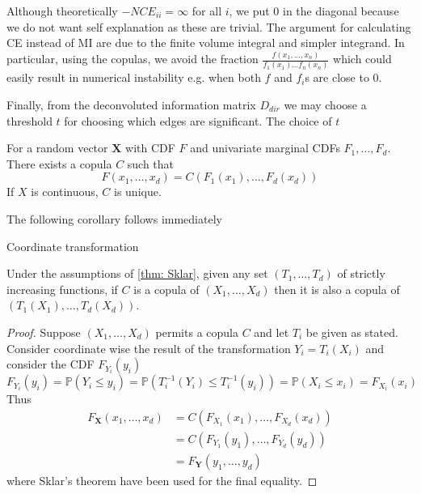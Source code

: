 \documentclass[../Thesis.tex]{subfiles}
\begin{document}
Although theoretically $-NCE_{ii} = \infty$ for all $i$, we put $0$ in the diagonal because we do not want self explanation as these are trivial. The argument for calculating CE instead of MI are due to the finite volume integral and simpler integrand. In particular, using the copulas, we avoid the fraction $\frac{f(x_1,\dots,x_n)}{f_1(x_1)\dots f_n(x_n)}$ which could easily result in numerical instability e.g. when both $f$ and $f_i$s are close to 0.

Finally, from the deconvoluted information matrix $D_{dir}$ we may choose a threshold $t$ for choosing which edges are significant. The choice of $t$


\newpage
\begin{theorem} \label{thm: Sklar}
    For a random vector $\boldsymbol X$ with CDF $F$ and univariate marginal CDFs $F_1, \dots, F_d$. There exists a copula $C$ such that
    $$ F(x_1,\dots,x_d) = C(F_1(x_1), \dots, F_d(x_d)) $$
    If $X$ is continuous, $C$ is unique.
\end{theorem}

The following corollary follows immediately
\begin{corollary} \label{coro: Coordinate transformation}
    Coordinate transformation

    Under the assumptions of \autoref{thm: Sklar}, given any set $(T_1, \dots, T_d)$ of strictly increasing functions, if $C$ is a copula of $(X_1,\dots, X_d)$ then it is also a copula of $(T_1(X_1), \dots, T_d(X_d))$.
\end{corollary}

\begin{proof}
    Suppose $(X_1 , \dots , X_d)$ permits a copula $C$ and let $T_i$ be given as stated. Consider coordinate wise the result of the transformation $Y_i = T_i(X_i)$ and consider the CDF $F_{Y_i}(y_i)$
    $$F_{Y_i}(y_i) = \mathbb{P}\left(Y_i \leq y_i\right) = \mathbb{P}\left(T_i^{-1}(Y_i) \leq T_i^{-1}(y_i)\right) = \mathbb{P}\left(X_i \leq x_i\right) = F_{X_i}(x_i)$$
    Thus
    \begin{align*}
        F_{\boldsymbol X} (x_1,\dots , x_d) & = C\left( F_{X_1}(x_1), \dots, F_{X_d}(x_d)\right) \\
                                            & = C\left( F_{Y_1}(y_1), \dots, F_{Y_d}(y_d)\right) \\
                                            & = F_{\boldsymbol Y}(y_1, \dots, y_d)
    \end{align*}
    where Sklar's theorem have been used for the final equality.
\end{proof}
\end{document}
